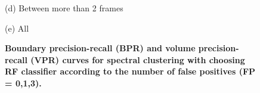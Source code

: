 \begin{figure}[htbp]
\begin{minipage}[t]{1\textwidth}
\footnotesize (d) Between more than 2 frames
\end{minipage}
\begin{minipage}[t]{1\textwidth}
\centering
{} 
\quad
{} 

\footnotesize (e) All
\end{minipage}

\caption[Boundary precision-recall and volume precision-recall curves for spectral clustering with choosing RF classifier according to the number of false positives equal 0,1,3]{
{\bf Boundary precision-recall (BPR) and volume precision-recall (VPR) curves for spectral clustering with choosing RF classifier according to the number of false positives (FP = 0,1,3).}}
\label{fig:sc_fp}
\end{figure}

